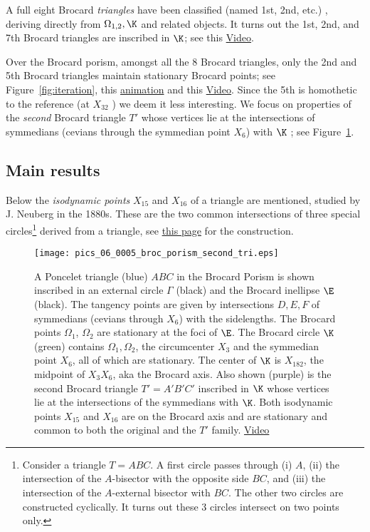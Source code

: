 A full eight Brocard {\em triangles}
have been classified (named 1st, 2nd, etc.) \cite{gibert2020-brocard}, deriving directly from $\Omega_{1,2},\K$ and related objects. It turns out the 1st, 2nd, and 7th Brocard triangles are inscribed in $\K$; see this \href{http://youtu.be/_bK-BCQv24A}{Video}.

Over the Brocard porism, amongst all the 8 Brocard triangles, only the 2nd and 5th Brocard triangles maintain stationary Brocard points; see Figure~\ref{fig:iteration}, this \href{https://bit.ly/2SG7Dxr}{animation} and this \href{https://youtu.be/MprJtB4UW9s}{Video}. Since  the 5th is homothetic to the reference (at $X_{32}$ \cite{gibert2020-anti-brocard}) we deem it less interesting. We focus on properties of the {\em second} Brocard triangle $T'$ whose vertices lie at the intersections of symmedians (cevians through the symmedian point $X_6$) with $\K$ \cite[Second Brocard Triangle]{mw}; see Figure~\ref{fig:broc-por-sec-tri}.

\subsection*{Main results}

Below the {\em isodynamic points} $X_{15}$ and $X_{16}$ of a triangle are mentioned, studied by J. Neuberg in the 1880s. These are the two common intersections of three special circles\footnote{Consider a triangle $T=ABC$. A first circle passes through (i) $A$, (ii) the intersection of the $A$-bisector with the opposite side $BC$, and (iii) the intersection of the $A$-external bisector with $BC$. The other two circles are constructed cyclically. It turns out these 3 circles intersect on two points only.} derived from a triangle, see \href{https://en.wikipedia.org/wiki/Isodynamic_point}{this page} for the construction.

\begin{figure}
    \centering
    \texttt{[image: pics\_06\_0005\_broc\_porism\_second\_tri.eps]}
    \caption{A Poncelet triangle (blue) $A B C$ in the Brocard Porism is shown inscribed in an external circle $\Gamma$ (black) and the Brocard inellipse $\E$ (black). The tangency points are given by intersections $D,E,F$ of symmedians (cevians through $X_6$) with the sidelengths. The Brocard points $\Omega_1$, $\Omega_2$ are stationary at the foci of $\E$. The Brocard circle $\K$ (green) contains $\Omega_1,\Omega_2$, the circumcenter $X_3$ and the symmedian point $X_6$, all of which are stationary. The center of $\K$ is $X_{182}$, the midpoint of $X_3 X_6$, aka the Brocard axis. Also shown (purple) is the second Brocard triangle $T'=A' B' C'$ inscribed in $\K$ whose vertices lie at the intersections of the symmedians with $\K$. Both isodynamic points $X_{15}$ and $X_{16}$ are on the Brocard axis and are stationary and common to both the original and the $T'$ family. \href{https://youtu.be/Wgwh4-neJp4}{Video}}
    \label{fig:broc-por-sec-tri}
\end{figure}

